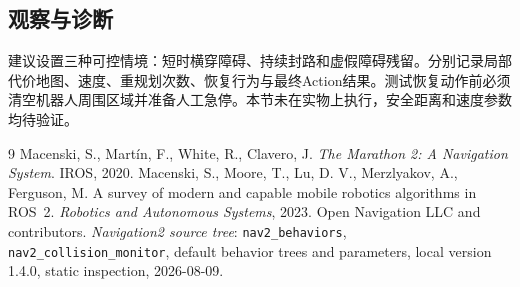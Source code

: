 \documentclass[UTF8,zihao=-4]{ctexart}
\begin{document}
\subsection*{观察与诊断}

建议设置三种可控情境：短时横穿障碍、持续封路和虚假障碍残留。分别记录局部代价地图、速度、重规划次数、恢复行为与最终Action结果。测试恢复动作前必须清空机器人周围区域并准备人工急停。本节未在实物上执行，安全距离和速度参数均待验证。

\begin{thebibliography}{9}
 Macenski, S., Martín, F., White, R., Clavero, J. \emph{The Marathon 2: A Navigation System}. IROS, 2020.
 Macenski, S., Moore, T., Lu, D. V., Merzlyakov, A., Ferguson, M. A survey of modern and capable mobile robotics algorithms in ROS~2. \emph{Robotics and Autonomous Systems}, 2023.
 Open Navigation LLC and contributors. \emph{Navigation2 source tree}: \texttt{nav2\_behaviors}, \texttt{nav2\_collision\_monitor}, default behavior trees and parameters, local version 1.4.0, static inspection, 2026-08-09.
\end{thebibliography}
\end{document}
